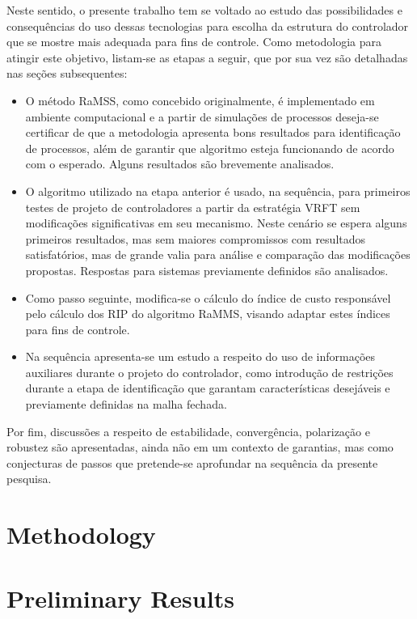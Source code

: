 Neste sentido, o presente trabalho tem se voltado ao estudo das possibilidades e consequências do uso dessas tecnologias para escolha da estrutura do controlador que se mostre mais adequada para fins de controle. Como metodologia para atingir este objetivo, listam-se as etapas a seguir, que por sua vez são detalhadas nas seções subsequentes:
\begin{itemize}
    \item O método RaMSS, como concebido originalmente, é implementado em ambiente computacional e a partir de simulações de processos deseja-se certificar de que a metodologia apresenta bons resultados para identificação de processos, além de garantir que algoritmo esteja funcionando de acordo com o esperado. Alguns resultados são brevemente analisados.
    \item O algoritmo utilizado na etapa anterior é usado, na sequência, para primeiros testes de projeto de controladores a partir da estratégia VRFT sem modificações significativas em seu mecanismo. Neste cenário se espera alguns primeiros resultados, mas sem maiores compromissos com resultados satisfatórios, mas de grande valia para análise e comparação das modificações propostas. Respostas para sistemas previamente definidos são analisados.
    \item Como passo seguinte, modifica-se o cálculo do índice de custo responsável pelo cálculo dos RIP do algoritmo RaMMS, visando adaptar estes índices para fins de controle.
    \item Na sequência apresenta-se um estudo a respeito do uso de informações auxiliares durante o projeto do controlador, como introdução de restrições durante a etapa de identificação que garantam características desejáveis e previamente definidas na malha fechada.
\end{itemize}

Por fim, discussões a respeito de estabilidade, convergência, polarização e robustez são apresentadas, ainda não em um contexto de garantias, mas como conjecturas de passos que pretende-se aprofundar na sequência da presente pesquisa.

\section{Methodology}\label{sec:CSS_metod}


\section{Preliminary Results}\label{sec:prel_results}



